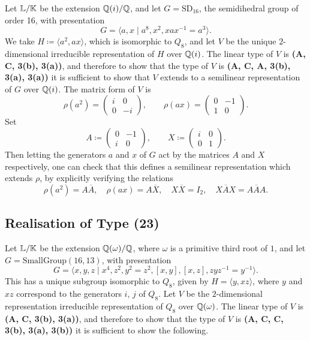 Let ${\mathbb L} / {\mathbb K}$ be the extension ${\mathbb Q}(i) / {\mathbb Q}$, and let $G = \text{SD}_{16}$, the semidihedral group of order 16, with presentation
\[
G = \langle a,x \mid a^8, x^2, xax^{-1} = a^3\rangle.
\]
We take $H \coloneqq \langle a^2, ax \rangle$, which is isomorphic to $Q_8$, and let $V$ be the unique $2$-dimensional irreducible representation of $H$ over ${\mathbb Q}(i)$. The linear type of $V$ is \textbf{(A, C, 3(b), 3(a))}, and therefore to show that the type of $V$ is \textbf{(A, C, A, 3(b), 3(a), 3(a))} it is sufficient to show that $V$ extends to a semilinear representation of $G$ over ${\mathbb Q}(i)$. The matrix form of $V$ is 
\[
\rho(a^2) = \begin{pmatrix}
    i & 0 \\ 0 & -i
\end{pmatrix}, \qquad \rho(ax) = \begin{pmatrix}
    0 & -1 \\ 1 & 0
\end{pmatrix}.
\]
Set
\[
A \coloneqq \begin{pmatrix}
    0 & -1 \\ i & 0
\end{pmatrix}, \qquad X \coloneqq \begin{pmatrix}
    i & 0 \\ 0 & 1
\end{pmatrix}.
\]
Then letting the generators $a$ and $x$ of $G$ act by the matrices $A$ and $X$ respectively, one can check that this defines a semilinear representation which extends $\rho$, by explicitly verifying the relations
\[
\rho(a^2) = A \overline{A} , \quad \rho(ax) = A \overline{X}, \quad X \overline{X} = I_2, \quad X \overline{A} X = A \overline{A} A.
\]

\subsection{Realisation of Type (23)}

Let ${\mathbb L} / {\mathbb K}$ be the extension ${\mathbb Q}(\omega) / {\mathbb Q}$, where $\omega$ is a primitive third root of $1$, and let $G = \text{SmallGroup}(16,13)$, with presentation
\[
G = \langle x,y,z \mid x^4, z^2, y^2 = z^2, [x,y], [x,z], zyz^{-1} = y^{-1}\rangle.
\]
This has a unique subgroup isomorphic to $Q_8$, given by $H = \langle y, xz\rangle$, where $y$ and $xz$ correspond to the generators $i$, $j$ of $Q_8$. Let $V$ be the $2$-dimensional representation irreducible representation of $Q_8$ over ${\mathbb Q}(\omega)$. The linear type of $V$ is \textbf{(A, C, 3(b), 3(a))}, and therefore to show that the type of $V$ is \textbf{(A, C, C, 3(b), 3(a), 3(b))} it is sufficient to show the following.


